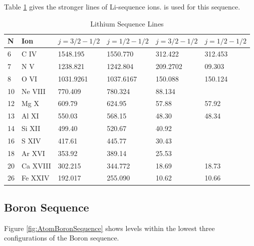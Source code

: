 Table \ref{tab:LiSequence} gives the stronger lines of Li-sequence ions.    is used for this sequence.

\begin{table}
\caption{Lithium Sequence Lines }
\label{tab:LiSequence}
\begin{tabular}{llllll}
\hline
N& Ion& $j=3/2-1/2$& $j=1/2-1/2$& $j=3/2-1/2$& $j=1/2-1/2$\\
\hline
6& C IV& 1548.195& 1550.770& 312.422& 312.453\\
7& N V&  1238.821& 1242.804& 209.2702& 09.303\\
8& O VI& 1031.9261& 1037.6167& 150.088& 150.124\\
10& Ne VIII& 770.409& 780.324& 88.134\\
12& Mg X& 609.79& 624.95& 57.88& 57.92\\
13& Al XI& 550.03& 568.15& 48.30& 48.34\\
14& Si XII& 499.40& 520.67& 40.92\\
16& S XIV& 417.61& 445.77& 30.43\\
18& Ar XVI& 353.92& 389.14& 25.53\\
20& Ca XVIII& 302.215& 344.772& 18.69& 18.73\\
26& Fe XXIV& 192.017& 255.090& 10.62& 10.66\\
\hline
\end{tabular}
\end{table}

\subsection{Boron Sequence}

Figure \ref{fig:AtomBoronSequence} shows levels within
the lowest three configurations of the Boron
sequence.

